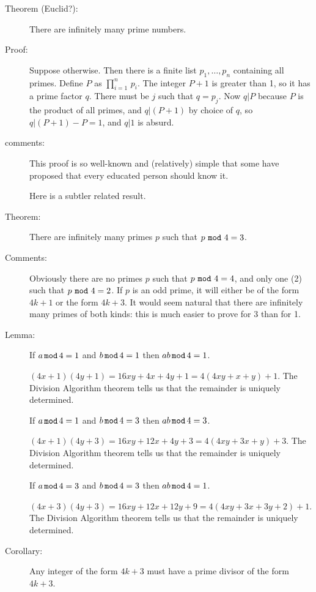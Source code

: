 \documentclass[12pt]{article}
\begin{document}
\begin{description}
\item[Theorem (Euclid?):]  There are infinitely many prime numbers.

\item[Proof:]  Suppose otherwise.  Then there is a finite list $p_1,\ldots,p_n$ containing all primes.  Define $P$ as
$\prod_{i=1}^n\,p_i$.  The integer $P+1$ is greater than 1, so it has a prime factor $q$.  There must be $j$ such that $q=p_j$.
Now $q|P$ because $P$ is the product of all primes, and $q|(P+1)$ by choice of $q$, so $q|(P+1)-P=1$, and $q|1$ is absurd.

\item[comments:]This proof is so well-known and (relatively) simple that some have proposed that every educated person should know it.

Here is a subtler related result.

\item[Theorem:]  There are infinitely many primes $p$ such that $p \,\,{\tt mod}\, \,4=3$.

\item[Comments:]  Obviously there are no primes $p$ such that $p \,\,{\tt mod}\, \,4=4$, and only one (2) such that $p \,\,{\tt mod}\, \,4=2$.
If $p$ is an odd prime, it will either be of the form $4k+1$ or the form $4k+3$.  It would seem natural that there are infinitely many primes of both kinds:  this is much easier to prove for 3 than for 1.

\item[Lemma:]  If $a \,{\tt mod}\, 4 =1$ and $b \,{\tt mod}\, 4 = 1$ then $ab \,{\tt mod}\, 4 = 1$.

$(4x+1)(4y+1) = 16xy + 4x+4y+1 = 4(4xy+x+y)+1$.  The Division Algorithm theorem tells us that the remainder is uniquely determined.

If $a \,{\tt mod}\, 4 =1$ and $b \,{\tt mod}\, 4 = 3$ then $ab \,{\tt mod}\, 4 = 3$.

$(4x+1)(4y+3) = 16xy + 12x +4y+3 = 4(4xy+3x+y)+3$.  The Division Algorithm theorem tells us that the remainder is uniquely determined.

If $a \,{\tt mod}\, 4 =3$ and $b \,{\tt mod}\, 4 = 3$ then $ab \,{\tt mod}\, 4 = 1$.

$(4x+3)(4y+3) = 16xy + 12x+12y +9 = 4(4xy +3x+3y+2)+1$.  The Division Algorithm theorem tells us that the remainder is uniquely determined.

\item[Corollary:]  Any integer of the form $4k+3$ must have a prime divisor of the form $4k+3$.


\end{description}
\end{document}
